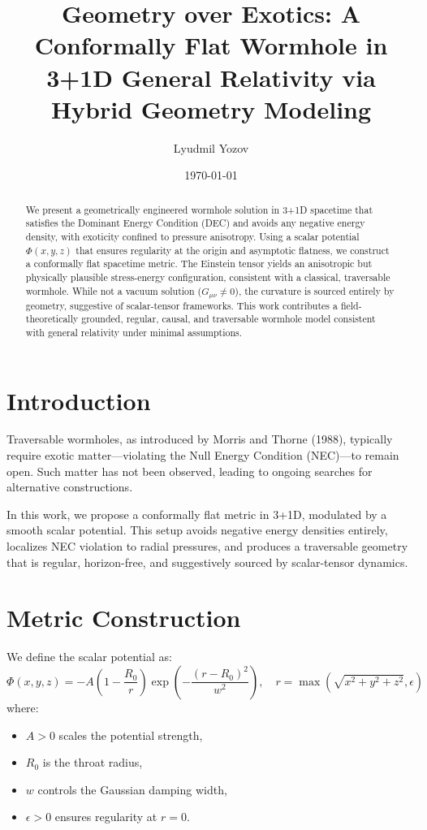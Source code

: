 \documentclass[12pt]{article}
\title{Geometry over Exotics: A Conformally Flat Wormhole in 3+1D General Relativity via Hybrid Geometry Modeling}
\author{Lyudmil Yozov}
\date{\today}
\begin{document}
\maketitle

\begin{abstract}
We present a geometrically engineered wormhole solution in 3+1D spacetime that satisfies the Dominant Energy Condition (DEC) and avoids any negative energy density, with exoticity confined to pressure anisotropy. Using a scalar potential \( \Phi(x, y, z) \) that ensures regularity at the origin and asymptotic flatness, we construct a conformally flat spacetime metric. The Einstein tensor yields an anisotropic but physically plausible stress-energy configuration, consistent with a classical, traversable wormhole. While not a vacuum solution (\( G_{\mu\nu} \neq 0 \)), the curvature is sourced entirely by geometry, suggestive of scalar-tensor frameworks. This work contributes a field-theoretically grounded, regular, causal, and traversable wormhole model consistent with general relativity under minimal assumptions.
\end{abstract}

\section{Introduction}
Traversable wormholes, as introduced by Morris and Thorne (1988), typically require exotic matter---violating the Null Energy Condition (NEC)---to remain open. Such matter has not been observed, leading to ongoing searches for alternative constructions.

In this work, we propose a conformally flat metric in 3+1D, modulated by a smooth scalar potential. This setup avoids negative energy densities entirely, localizes NEC violation to radial pressures, and produces a traversable geometry that is regular, horizon-free, and suggestively sourced by scalar-tensor dynamics.

\section{Metric Construction}
We define the scalar potential as:
\[
\Phi(x, y, z) = -A \left(1 - \frac{R_0}{r}\right) \exp\left(-\frac{(r - R_0)^2}{w^2}\right), \quad r = \max\left(\sqrt{x^2 + y^2 + z^2}, \epsilon\right)
\]
where:
\begin{itemize}
  \item \(A > 0\) scales the potential strength,
  \item \(R_0\) is the throat radius,
  \item \(w\) controls the Gaussian damping width,
  \item \(\epsilon > 0\) ensures regularity at \(r = 0\).
\end{itemize}
\end{document}
